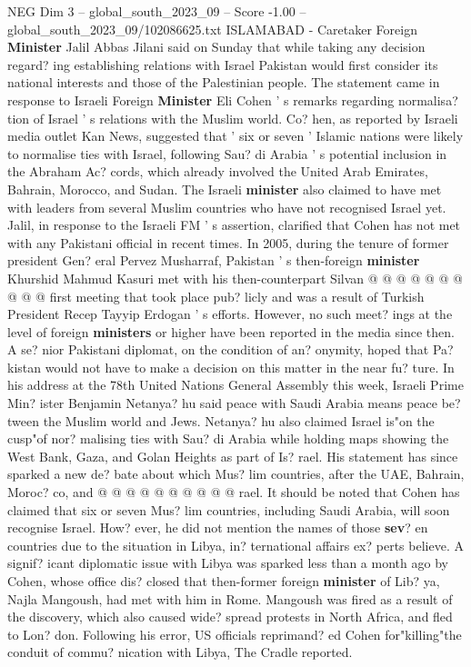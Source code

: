 \begin{textsample}{NEG Dim 3 – global\_south\_2023\_09 – Score -1.00 – global\_south\_2023\_09/102086625.txt}  \label{ex:f3_neg_301}
ISLAMABAD - Caretaker Foreign \textbf{Minister} Jalil Abbas Jilani said on Sunday that while taking any decision regard? ing establishing relations with Israel Pakistan would first consider its national interests and those of the Palestinian people.
The statement came in response to Israeli Foreign \textbf{Minister} Eli Cohen ' s remarks regarding normalisa? tion of Israel ' s relations with the Muslim world.
Co? hen, as reported by Israeli media outlet Kan News, suggested that ' six or seven ' Islamic nations were likely to normalise ties with Israel, following Sau? di Arabia ' s potential inclusion in the Abraham Ac? cords, which already involved the United Arab Emirates, Bahrain, Morocco, and Sudan.
The Israeli \textbf{minister} also claimed to have met with leaders from several Muslim countries who have not recognised Israel yet.
Jalil, in response to the Israeli FM ' s assertion, clarified that Cohen has not met with any Pakistani official in recent times.
In 2005, during the tenure of former president Gen? eral Pervez Musharraf, Pakistan ' s then-foreign \textbf{minister} Khurshid Mahmud Kasuri met with his then-counterpart Silvan @ @ @ @ @ @ @ @ @ @ first meeting that took place pub? licly and was a result of Turkish President Recep Tayyip Erdogan ' s efforts.
However, no such meet? ings at the level of foreign \textbf{ministers} or higher have been reported in the media since then.
A se? nior Pakistani diplomat, on the condition of an? onymity, hoped that Pa? kistan would not have to make a decision on this matter in the near fu? ture.
In his address at the 78th United Nations General Assembly this week, Israeli Prime Min? ister Benjamin Netanya? hu said peace with Saudi Arabia means peace be? tween the Muslim world and Jews.
Netanya? hu also claimed Israel is"on the cusp"of nor? malising ties with Sau? di Arabia while holding maps showing the West Bank, Gaza, and Golan Heights as part of Is? rael.
His statement has since sparked a new de? bate about which Mus? lim countries, after the UAE, Bahrain, Moroc? co, and @ @ @ @ @ @ @ @ @ @ rael.
It should be noted that Cohen has claimed that six or seven Mus? lim countries, including Saudi Arabia, will soon recognise Israel.
How? ever, he did not mention the names of those \textbf{sev}? en countries due to the situation in Libya, in? ternational affairs ex? perts believe.
A signif? icant diplomatic issue with Libya was sparked less than a month ago by Cohen, whose office dis? closed that then-former foreign \textbf{minister} of Lib? ya, Najla Mangoush, had met with him in Rome.
Mangoush was fired as a result of the discovery, which also caused wide? spread protests in North Africa, and fled to Lon? don.
Following his error, US officials reprimand? ed Cohen for"killing"the conduit of commu? nication with Libya, The Cradle reported.

\end{textsample}
